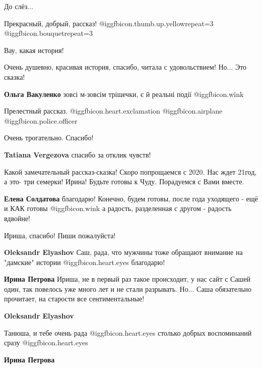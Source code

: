 \begin{itemize}
До слёз...

Прекрасный, добрый, рассказ! @igg{fbicon.thumb.up.yellow}{repeat=3}  @igg{fbicon.bouquet}{repeat=3} 

Вау, какая история!

Очень душевно, красивая история, спасибо, читала с удовольствием! Но... Это сказка!

\begin{itemize} %
\textbf{Ольга Вакуленко} зовсі м-зовсім трішечки, є й реальні події @igg{fbicon.wink} 
\end{itemize} %

Прелестный рассказ.  @igg{fbicon.heart.exclamation} @igg{fbicon.airplane}  @igg{fbicon.police.officer} 

Очень трогательно. Спасибо!

\textbf{Tatiana Vergezova} спасибо за отклик чувств!


Какой замечательный рассказ-сказка! Скоро попрощаемся с 2020. Нас ждет 21год, а
это- три семерки! Ирина! Будьте готовы к Чуду. Порадуемся с Вами вместе.

\begin{itemize} %
\textbf{Елена Солдатова} благодарю! Конечно, будем готовы, после года уходящего - ещё и КАК готовы @igg{fbicon.wink}  а радость, разделенная с другом - радость вдвойне!
\end{itemize} %

Ириша, спасибо! Пиши пожалуйста!

\begin{itemize} %
\textbf{Oleksandr Elyashov} Саш, рада, что мужчины тоже обращают внимание на "дамские" истории  @igg{fbicon.heart.eyes}  благодарю!

\textbf{Ирина Петрова} Ириша, не в первый раз такое происходит, у нас сайт с Сашей один, так повелось уже много лет и не стали разрывать. Но... Саша обязательно прочитает, на старости все сентиментальные!

\textbf{Oleksandr Elyashov} 

Танюша, и тебе очень рада @igg{fbicon.heart.eyes}  столько добрых воспоминаний
сразу @igg{fbicon.heart.eyes} 

\textbf{Ирина Петрова} 


\end{itemize}
\end{itemize}

